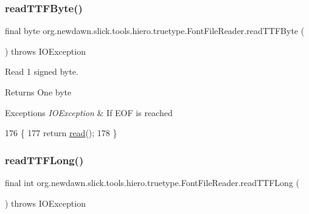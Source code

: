 \subsubsection{\texorpdfstring{read\+T\+T\+F\+Byte()}{readTTFByte()}}
{\footnotesize\ttfamily final byte org.\+newdawn.\+slick.\+tools.\+hiero.\+truetype.\+Font\+File\+Reader.\+read\+T\+T\+F\+Byte (\begin{DoxyParamCaption}{ }\end{DoxyParamCaption}) throws I\+O\+Exception\hspace{0.3cm}{\ttfamily [inline]}}

Read 1 signed byte.

\begin{DoxyReturn}{Returns}
One byte 
\end{DoxyReturn}

\begin{DoxyExceptions}{Exceptions}
{\em I\+O\+Exception} & If E\+OF is reached \\
\hline
\end{DoxyExceptions}

\begin{DoxyCode}
176                                                        \{
177         \textcolor{keywordflow}{return} \mbox{\hyperlink{classorg_1_1newdawn_1_1slick_1_1tools_1_1hiero_1_1truetype_1_1_font_file_reader_ac93685926f64d681f19741f63e569e10}{read}}();
178     \}
\end{DoxyCode}
\mbox{\label{classorg_1_1newdawn_1_1slick_1_1tools_1_1hiero_1_1truetype_1_1_font_file_reader_a6026dd8cdf3d1c3cfba14f945a12898d}} 
\subsubsection{\texorpdfstring{read\+T\+T\+F\+Long()}{readTTFLong()}}
{\footnotesize\ttfamily final int org.\+newdawn.\+slick.\+tools.\+hiero.\+truetype.\+Font\+File\+Reader.\+read\+T\+T\+F\+Long (\begin{DoxyParamCaption}{ }\end{DoxyParamCaption}) throws I\+O\+Exception\hspace{0.3cm}{\ttfamily [inline]}}


